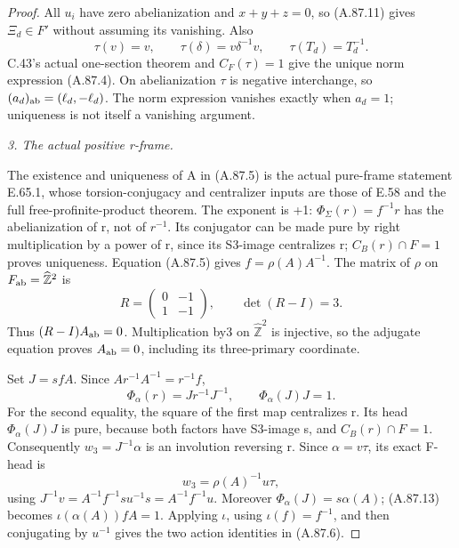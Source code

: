 \begin{proof}
All \(u_i\) have zero abelianization and \(x+y+z=0\), so (A.87.11)
gives \(\Xi_d\in F'\) without assuming its vanishing. Also
\[
 \tau(v)=v,\qquad \tau(\delta)=v\delta^{-1}v,
 \qquad\tau(T_d)=T_d^{-1}.
\]
C.43's actual one-section theorem and \(C_F(\tau)=1\) give the unique
norm expression (A.87.4). On abelianization \(\tau\) is negative
interchange, so \((a_d)_{\rm ab}=(\ell_d,-\ell_d)\).
The norm expression vanishes exactly when \(a_d=1\); uniqueness is
not itself a vanishing argument.

\emph{3. The actual positive r-frame.}\par
The existence and uniqueness of A in (A.87.5) is the actual pure-frame
statement E.65.1, whose torsion-conjugacy and centralizer inputs are
those of E.58 and the full free-profinite-product theorem.
\citep{A_HR1985}
The exponent is +1: \(\Phi_\Sigma(r)=f^{-1}r\) has the abelianization
of r, not of \(r^{-1}\). Its conjugator can be made pure by right
multiplication by a power of r, since its S3-image centralizes r;
\(C_B(r)\cap F=1\) proves uniqueness.
Equation (A.87.5) gives \(f=\rho(A)A^{-1}\). The matrix of \(\rho\)
on \(F_{\rm ab}=\widehat{\mathbb Z}^2\) is
\[
 R=\begin{pmatrix}0&-1\\1&-1\end{pmatrix},\qquad \det(R-I)=3.
\]
Thus \((R-I)A_{\rm ab}=0\). Multiplication by3 on
\(\widehat{\mathbb Z}^2\) is injective, so the adjugate equation proves
\(A_{\rm ab}=0\), including its three-primary coordinate.

Set \(J=sfA\). Since \(Ar^{-1}A^{-1}=r^{-1}f\),
\[
 \Phi_\alpha(r)=Jr^{-1}J^{-1},\qquad
 \Phi_\alpha(J)J=1.
 \tag{A.87.13}
\]
For the second equality, the square of the first map centralizes r.
Its head \(\Phi_\alpha(J)J\) is pure, because both factors have
S3-image s, and \(C_B(r)\cap F=1\). Consequently
\(w_3=J^{-1}\alpha\) is an involution reversing r. Since
\(\alpha=v\tau\), its exact F-head is
\[
 w_3=\rho(A)^{-1}u\tau,
\]
using \(J^{-1}v=A^{-1}f^{-1}su^{-1}s=A^{-1}f^{-1}u\).
Moreover \(\Phi_\alpha(J)=s\alpha(A)\); (A.87.13) becomes
\(\iota(\alpha(A))fA=1\). Applying \(\iota\), using
\(\iota(f)=f^{-1}\), and then conjugating by \(u^{-1}\) gives
the two action identities in (A.87.6).


\end{proof}
